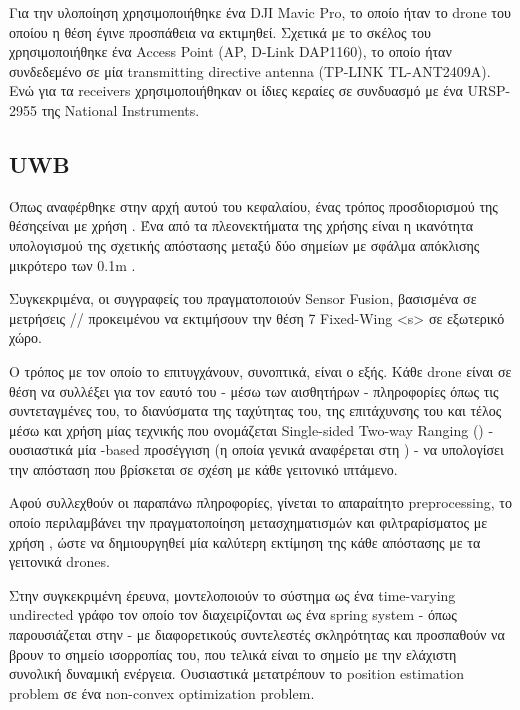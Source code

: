 Για την υλοποίηση χρησιμοποιήθηκε ένα DJI Mavic Pro, το οποίο ήταν το drone του οποίου η θέση έγινε προσπάθεια να εκτιμηθεί.
Σχετικά με το σκέλος του  χρησιμοποιήθηκε ένα Access Point (AP, D-Link DAP1160), το οποίο ήταν συ\-νδε\-δε\-μέ\-νο 
σε μία transmitting directive antenna (TP-LINK TL-ANT2409A). Ενώ για τα receivers χρησιμοποιήθηκαν οι ίδιες κεραίες σε συνδυασμό 
με ένα URSP-2955 της National Instruments.

\subsection{UWB}
Όπως αναφέρθηκε στην αρχή αυτού του κεφαλαίου, ένας τρόπος προσδιορισμού της θέσης\udot είναι με χρήση .
Ένα από τα πλεονεκτήματα της χρήσης  είναι η ικανότητα υπολογισμού της σχετικής απόστασης μεταξύ δύο
σημείων με σφάλμα απόκλισης μικρότερο των 0.1m \cite{uwb-accuracy}.

Συγκεκριμένα, οι συγγραφείς του \cite{uwb-imu-gps1} πραγματοποιούν Sensor Fusion, βασισμένα σε μετρήσεις 
// προκειμένου να εκτιμήσουν την θέση 
7 Fixed-Wing <s> σε εξωτερικό χώρο.

Ο τρόπος με τον οποίο το επιτυγχάνουν, συνοπτικά, είναι ο εξής. Κάθε drone είναι σε θέση να συλλέξει για τον εαυτό του 
- μέσω των αισθητήρων - πληροφορίες όπως τις συντεταγμένες του, το διανύσματα της ταχύτητας του, της
επιτάχυνσης του και τέλος μέσω \udot και χρήση μίας τεχνικής που ονομάζεται Single-sided Two-way Ranging 
() - ουσιαστικά μία -based προσέγγιση (η οποία γενικά αναφέρεται 
στη ) - να υπολογίσει την απόσταση που βρίσκεται σε σχέση με κάθε γειτονικό ιπτάμενο.

Αφού συλλεχθούν οι παραπάνω πληροφορίες, γίνεται το απαραίτητο preprocessing, το οποίο περιλαμβάνει την πραγματοποίηση μετασχηματισμών
και φιλτραρίσματος με χρήση , ώστε να δημιουργηθεί μία καλύτερη εκτίμηση της κάθε απόστασης με τα γειτονικά drones.

Στην συγκεκριμένη έρευνα, μοντελοποιούν το σύστημα ως ένα time-varying undirected γράφο τον οποίο τον διαχειρίζονται ως ένα spring system - 
όπως παρουσιάζεται στην  - με διαφορετικούς συντελεστές σκληρότητας και προσπαθούν να βρουν το σημείο ισορροπίας του, 
που τελικά είναι το σημείο με την ελάχιστη συνολική δυναμική ενέργεια. Ουσιαστικά μετατρέπουν το position estimation problem σε ένα 
non-convex optimization problem.

